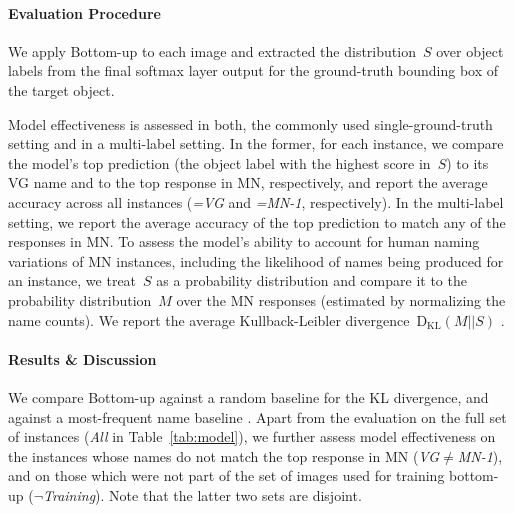 \paragraph{Evaluation Procedure}
We apply Bottom-up to each image and extracted the distribution~$S$ over object labels from the final softmax layer output for the ground-truth bounding box of the target object. 

Model effectiveness is assessed in both, the commonly used single-ground-truth setting and in a multi-label setting. 
In the former, for each instance, we compare the model's top prediction (the object label with the highest score in\ $S$) to its VG name and to the top response in MN, respectively, and report the average accuracy across all instances (\textit{=VG} and \textit{=MN-1}, respectively).
In the multi-label setting, we report the average accuracy of the top prediction to match any of the responses in MN. 
To assess the model's ability to account for human naming variations of MN instances, including the likelihood of names being produced for an instance, we treat\ $S$ as a probability distribution and compare it to the probability distribution~$M$ over the MN responses (estimated by normalizing the name counts). 
We report the average Kullback-Leibler divergence~$\mathrm{D_{KL}}(M||S)$ \cite{kullback1951information}. 

\iffalse
\textsl{top}: the model's top prediction
\begin{itemize}
	\item \textbf{=VG} The average model accuracy of \textsl{top} on the VG names
	\item \textbf{=MN-1} The average model accuracy of \textsl{top} on the top response in ManyNames
	\item \textbf{$\in$MN} The average model accuracy of \textsl{top} to match any name of the responses in ManyNames
	\item \textbf{KL} The average Kullback-Leibler divergence~$\mathrm{D_{KL}}(M||S)$ of the model's softmax output~$S$ and the  probability distribution~$M$ over ManyNames, estimated by normalizing the name counts per instance
\end{itemize}
\fi

\paragraph{Results \& Discussion} 
We compare Bottom-up against a random baseline for the KL divergence, and against a most-frequent name baseline . 
Apart from the evaluation on the full set of instances (\textit{\mbox{All}} in Table~\ref{tab:model}), we further assess model effectiveness on the instances whose  \vg names do not match the top response in MN (\mbox{\textit{VG}$\neq$\textit{MN-1}}), and on those which were not part of the set of images used for training bottom-up (\mbox{$\neg$\textit{Training}}).
Note that the latter two sets are disjoint. 
%

